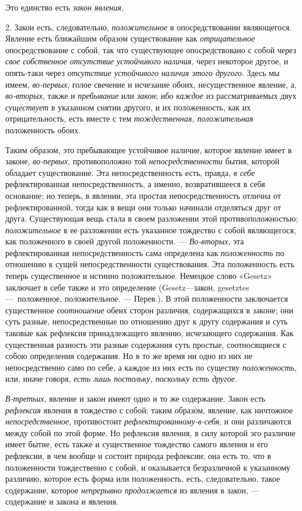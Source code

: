 Это единство есть {\em закон явления}.

2. Закон есть, следовательно, {\em положительное} в
опосредствовании являющегося. Явление есть ближайшим образом существование
как {\em отрицательное} опосредствование с собой, так
что существующее опосредствовано с собой через
{\em свое собственное отсутствие устойчивого наличия},
через некоторое другое, и опять-таки через
{\em отсутствие устойчивого наличия этого другого}.
Здесь мы имеем, {\em во-первых}, голое свечение и
исчезание обоих, несущественное явление, а,
{\em во-вторых}, также и
{\em пребывание} или {\em закон};
ибо {\em каждое} из рассматриваемых двух
{\em существует} в указанном снятии другого, и их
положенность, как их отрицательность, есть вместе с тем
{\em тождественная, положительная} положенность обоих.

Таким образом, это пребывающее устойчивое наличие, которое явление имеет в
законе, {\em во-первых}, противоположно той
{\em непосредственности} бытия, которой обладает
существование. Эта непосредственность есть, правда,
{\em в себе} рефлектированная непосредственность, а
именно, возвратившееся в себя основание; но теперь, в явлении, эта простая
непосредственность отлична от рефлектированной, тогда как в вещи они только
начинали отделяться друг от друга. Существующая вещь стала в своем
разложении этой противоположностью; {\em положительное}
в ее разложении есть указанное тождество с собой являющегося, как
положенного в своей другой положенности. —
{\em Во-вторых}, эта рефлектированная
непосредственность сама определена как
{\em положенность} по отношению к сущей
непосредственности существования. Эта положенность есть теперь существенное
и истинно положительное. Немецкое слово «Gesetz» заключает в себе также и
это определение (Gesetz—закон, gesetztes —~положенное, положительное. —
Перев.). В этой положенности заключается существенное
{\em соотношение} обеих сторон различия, содержащихся в
законе; они суть разные, непосредственные по отношению друг к другу
содержания и суть таковые как рефлексия принадлежащего явлению, исчезающего
содержания. Как существенная разность эти разные содержания суть простые,
соотносящиеся с собою определения содержания. Но в то же время ни одно из
них не непосредственно само по себе, а каждое из них есть по существу
{\em положенность}, или, иначе говоря,
{\em есть лишь постольку, поскольку есть другое}.

{\em В-третьих}, явление и закон имеют одно и то же
содержание. Закон есть {\em рефлексия} явления в
тождество с собой; таким образом, явление, как ничтожное
{\em непосредственное}, противостоит
{\em рефлектированному-в-себя}, и они различаются между
собой по этой форме. Но рефлексия явления, в силу которой эго различие
имеет бытие, есть также и существенное тождество самого явления и его
рефлексии, в чем вообще и состоит природа рефлексии; она есть то, что в
положенности тождественно с собой, и оказывается безразличной к указанному
различию, которое есть форма или положенность, есть, следовательно, такое
содержание, которое {\em непрерывно продолжается} из
явления в закон, — содержание и закона и явления.

